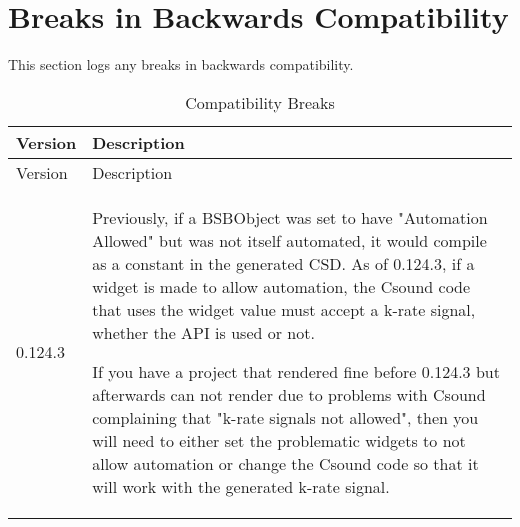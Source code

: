 \section{Breaks in Backwards Compatibility}

This section logs any breaks in backwards compatibility.

\begin{longtable}[]{@{}ll@{}}
\caption{Compatibility Breaks}\tabularnewline
\toprule
Version & Description\tabularnewline
\midrule
\endfirsthead
\toprule
Version & Description\tabularnewline
\midrule
\endhead
0.124.3 & Previously, if a BSBObject was set to have "Automation
Allowed" but was not itself automated, it would compile as a constant in
the generated CSD. As of 0.124.3, if a widget is made to allow
automation, the Csound code that uses the widget value must accept a
k-rate signal, whether the API is used or not.

If you have a project that rendered fine before 0.124.3 but afterwards
can not render due to problems with Csound complaining that "k-rate
signals not allowed", then you will need to either set the problematic
widgets to not allow automation or change the Csound code so that it
will work with the generated k-rate signal.\tabularnewline
\bottomrule
\end{longtable}
